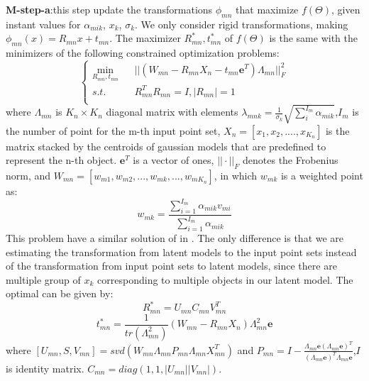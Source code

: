 \textbf{M-step-a}:this step update the transformations $\phi_{mn}$ that maximize $f(\Theta)$, given instant values for $\alpha_{mik}$, $x_k$, $\sigma_k$. We only consider rigid transformations, making  $\phi_{mn}(x)=R_{mn}x+t_{mn}$. The maximizer $R_{mn}^*,t_{mn}^*$  of $f(\Theta)$ is the same with the minimizers of the following constrained optimization problems:\\
\begin{equation}
\left\{
\begin{array}{rcl}
\min_{R_{mn},t_{mn}}&      &||(W_{mn}-R_{mn}X_n-t_{mn}\mathbf{e}^T)\Lambda_{mn}||_F^2\\
s.t.&      &R_{mn}^TR_{mn}=I, |R_{mn}|=1\\
\end{array} \right.
\end{equation}
where $\Lambda_{mn}$ is $K_n \times K_n$ diagonal matrix with elements $\lambda_{mnk}=\frac{1}{\sigma_k}\sqrt{\sum_i^{I_{m}}\alpha_{mik}}$,$I_m$ is the number of point for the m-th input point set, $X_n = [x_1,x_2,....,x_{K_n}]$ is the matrix stacked by the centroids of gaussian models that are predefined to represent the n-th object. $\mathbf{e}^T$ is a vector of ones, $||\cdot||_F$ denotes the Frobenius norm, and $W_{mn}=[w_{m1},w_{m2},...,w_{mk},...,w_{mK_n}]$, in which $w_{mk}$ is a weighted point as:\\
\begin{equation}
w_{mk}=\frac{\sum_{i=1}^{I_m}\alpha_{mik}v_{mi}}{\sum_{i=1}^{I_m}\alpha_{mik}}
\end{equation}
This problem have a similar solution of in \cite{Evangelidis2014}. The only difference is that we are estimating the transformation from latent models to the input point sets instead of the transformation from input point sets to latent models, since there are multiple group of $x_k$ corresponding to multiple objects in our latent model. The optimal can be given by:\\
\begin{equation}
\label{equ:updateR}
R_{mn}^*=U_{mn}C_{mn}V_{mn}^T
\end{equation}
\begin{equation}
\label{equ:updatet}
t_{mn}^*=\frac{1}{tr(\Lambda_{mn}^2)}(W_{mn}-R_{mn}X_n)\Lambda_{mn}^2\mathbf{e}
\end{equation}
where $[U_{mn},S,V_{mn}]=svd( W_{mn}\Lambda_{mn}P_{mn}\Lambda_{mn}X_{mn}^T )$ and $P_{mn}=I-\frac{\Lambda_{mn}\mathbf{e}(\Lambda_{mn}\mathbf{e})^T}{(\Lambda_{mn}\mathbf{e})^T\Lambda_{mn}\mathbf{e}}$,$I$ is identity matrix. $C_{mn}=diag(1,1,|U_{mn}||V_{mn}|)$.\\
